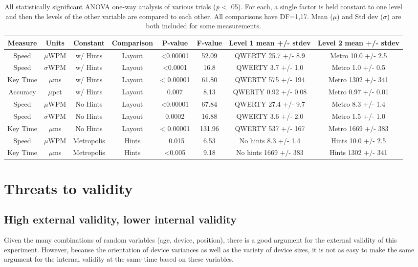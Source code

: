 \documentclass[english]{vgtc}
\begin{document}
\begin{table}[]
  \centering
  \begin{tabular}{c|c|c|c|c|c|c|c}
  \toprule
  Measure & Units & Constant & Comparison & P-value & F-value & Level 1 mean +/- stdev & Level 2 mean +/- stdev \\
  \midrule
  Speed & $\mu$WPM & w/ Hints & Layout & <0.00001 & 52.09 & QWERTY 25.7 +/- 8.9 & Metro 10.0 +/- 2.5 \\
  Speed & $\sigma$WPM & w/ Hints & Layout & <0.0001 & 16.8 & QWERTY 3.7 +/- 1.0 & Metro 1.0 +/- 0.5 \\
  Key Time & $\mu$ms & w/ Hints & Layout & < 0.00001 & 61.80 & QWERTY 575 +/- 194 & Metro 1302 +/- 341 \\
  Accuracy & $\mu$pct & w/ Hints & Layout & 0.007 & 8.13 & QWERTY 0.92 +/- 0.08 & Metro 0.97 +/- 0.01 \\
  Speed & $\mu$WPM & No Hints & Layout & <0.00001 & 67.84 & QWERTY 27.4 +/- 9.7 & Metro 8.3 +/- 1.4 \\
  Speed & $\sigma$WPM & No Hints & Layout & 0.0002 & 16.88 & QWERTY 3.6 +/- 2.0 & Metro 1.5 +/- 1.0 \\
  Key Time & $\mu$ms & No Hints & Layout & < 0.00001 & 131.96 & QWERTY 537 +/- 167 & Metro 1669 +/- 383 \\
  Speed & $\mu$WPM & Metropolis & Hints & ~0.015 & 6.53 & No hints 8.3 +/- 1.4 & Hints 10.0 +/- 2.5 \\
  Key Time & $\mu$ms & Metropolis & Hints & <0.005 & 9.18 & No hints 1669 +/- 383 & Hints 1302 +/- 341 \\
  \bottomrule
  \end{tabular}
  \caption{All statistically significant ANOVA one-way analysis of various trials (\emph{p} < .05).  For each, a single factor is held constant to one level and then the levels of the other variable are compared to each other. All comparisons have DF=1,17. Mean ($\mu$) and Std dev ($\sigma$) are both included for some measurements.}
  \label{table:anova}
\end{table}

\section{Threats to validity}
\subsection{High external validity, lower internal validity}
Given the many combinations of random variables (age, device, position), there is a good argument for the
external validity of this experiment.  However, because the orientation of device variances as well as 
the variety of device sizes, it is not as easy to make the same argument for the internal validity at the
same time based on these variables.
\end{document}
